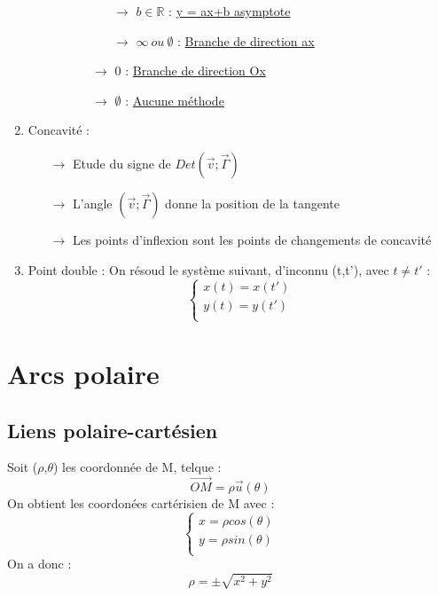 \begin{enumerate}[1-]
\begin{itemize}
\begin{itemize}
\begin{itemize}
\begin{itemize}
 \item[$\rightarrow$] $b \in \mathbb{R}$ : \underline{y = ax+b asymptote}\\
 \item[$\rightarrow$] $\infty~ ou~ \emptyset$ : \underline{Branche de direction ax}\\
\end{itemize}
 \item[$\rightarrow$] 0 : \underline{Branche de direction Ox}\\
 \item[$\rightarrow$] $\emptyset$ : \underline{Aucune méthode}\\
\end{itemize}
\end{itemize}
\end{itemize}
\item Concavité :\\
\begin{itemize}
 \item[$\rightarrow$] Etude du signe de $Det(\overrightarrow{v};\overrightarrow{\Gamma})$\\
\item[$\rightarrow$] L'angle $(\overrightarrow{v};\overrightarrow{\Gamma})$ donne la position de la tangente\\
\item[$\rightarrow$] Les points d'inflexion sont les points de changements de concavité\\
\end{itemize}
\item Point double : On résoud le système suivant, d'inconnu (t,t'), avec $t \neq t'$ :
\[\left\{\begin{array}{l}
   x(t) = x(t')\\
   y(t) = y(t') \\
  \end{array}\right.\]
\end{enumerate}
\section{Arcs polaire}
\subsection{Liens polaire-cartésien}
Soit ($\rho$,$\theta$) les coordonnée de M, telque :
$$\overrightarrow{OM} = \rho\overrightarrow{u}(\theta)$$
On obtient les coordonées cartérisien de M avec : 
\[\left\{\begin{array}{l}
   x = \rho cos(\theta)\\
   y = \rho sin(\theta)\\
  \end{array}\right.\]
On a donc : 
$$\rho = \pm \sqrt{x^2 + y^2}$$
